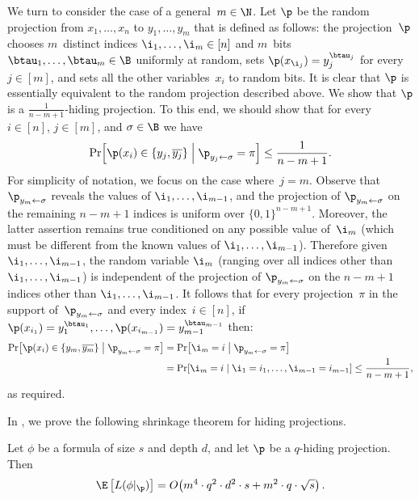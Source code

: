 \documentclass{toc}
\begin{document}
\begin{example}
\label{ex:random-m-variables-alive}We turn to consider the case of a
general~$m\in\N$. Let $\p$ be the random projection from $x_{1},\ldots,x_{n}$
to $y_{1},\ldots,y_{m}$ that is defined as follows: the projection~$\p$
chooses $m$~distinct indices $\i_{1},\ldots,\i_{m}\in\left[n\right]$
and $m$~bits $\btau_{1},\ldots,\btau_{m}\in\B$ uniformly at random,
sets $\p(x_{\i_{j}})=y_{j}^{\btau_{j}}$ for every $j\in\left[m\right]$,
and sets all the other variables~$x_{i}$ to random bits. It is clear
that $\p$ is essentially equivalent to the random projection described
above. We show that $\p$ is a $\frac{1}{n-m+1}$-hiding projection.
To this end, we should show that for every~$i\in\left[n\right]$,
$j\in\left[m\right]$, and $\sigma\in\B$ we have 
\[
\Pr\!\left[\p(x_{i})\in\left\{ y_{j},\overline{y_{j}}\right\} \;\middle|\;\p_{y_{j}\gets\sigma}=\pi\right]\le\frac{1}{n-m+1}.
\]
For simplicity of notation, we focus on the case where~$j=m$. Observe
that $\p_{y_{m}\gets\sigma}$ reveals the values of $\i_{1},\ldots,\i_{m-1}$,
and the projection of $\p_{y_{m}\gets\sigma}$ on the remaining $n-m+1$
indices is uniform over $\{0,1\}^{n-m+1}$. Moreover, the latter assertion
remains true conditioned on any possible value of~$\i_{m}$ (which
must be different from the known values of $\i_{1},\ldots,\i_{m-1}$).
Therefore given $\i_{1},\ldots,\i_{m-1}$, the random variable $\i_{m}$
(ranging over all indices other than $\i_{1},\ldots,\i_{m-1}$) is
independent of the projection of $\p_{y_{m}\gets\sigma}$ on the $n-m+1$
indices other than $\i_{1},\ldots,\i_{m-1}$. It follows that for
every projection~$\pi$ in the support of~$\p_{y_{m}\gets\sigma}$
and every index~$i\in\left[n\right]$, if $\p(x_{i_{1}})=y_{1}^{\btau_{1}},\ldots,\p(x_{i_{m-1}})=y_{m-1}^{\btau_{m-1}}$
then: 
\begin{align*}
\Pr\!\left[\p(x_{i})\in\left\{ y_{m},\overline{y_{m}}\right\} \;\middle|\;\p_{y_{m}\gets\sigma}=\pi\right] & =\Pr\!\left[\i_{m}=i\;\middle|\;\p_{y_{m}\gets\sigma}=\pi\right]\\
 & =\Pr\!\left[\i_{m}=i\;\middle|\;\i_{1}=i_{1},\ldots,\i_{m-1}=i_{m-1}\right]\le\frac{1}{n-m+1},
\end{align*}
as required.
\end{example}

In , we prove the following shrinkage theorem
for hiding projections. 
\begin{theorem}
\label{thm:shrinkage-hiding}Let $\phi$ be a formula of size $s$ and
depth $d$, and let $\p$ be a $q$-hiding projection. Then 
\[
\E\left[L(\phi|_{\p})\right]=O\!\left(m^{4}\cdot q^{2}\cdot d^{2}\cdot s+m^{2}\cdot q\cdot\sqrt{s}\right).
\]
\end{theorem}
\end{document}
